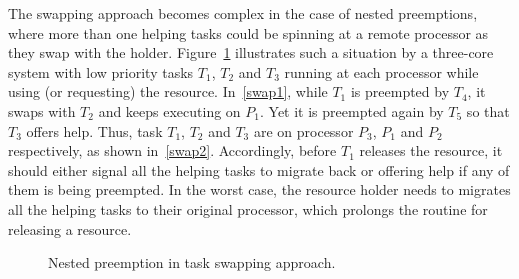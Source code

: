 \documentclass{report}
\begin{document}
The swapping approach becomes complex in the case of nested preemptions, where more than one helping tasks could be spinning at a remote processor as they swap with the holder. Figure~\ref{nestedpreemptiontaskswapping} illustrates such a situation by a three-core system with low priority tasks $T_{1}$, $T_{2}$ and $T_{3}$ running at each processor while using (or requesting) the resource. In~\ref{swap1}, while $T_{1}$ is preempted by $T_{4}$, it swaps with $T_{2}$ and keeps executing on $P_{1}$. Yet it is preempted again by $T_{5}$ so that $T_{3}$ offers help. Thus, task $T_{1}$, $T_{2}$ and $T_{3}$ are on processor $P_{3}$, $P_{1}$ and $P_{2}$ respectively, as shown in~\ref{swap2}. Accordingly, before $T_{1}$ releases the resource, it should either signal all the helping tasks to migrate back or offering help if any of them is being preempted. In the worst case, the resource holder needs to migrates all the helping tasks to their original processor, which prolongs the routine for releasing a resource.

\begin{figure}[h]
\centering
{}
\caption{Nested preemption in task swapping approach.}
\label{nestedpreemptiontaskswapping}
\end{figure}
\end{document}
